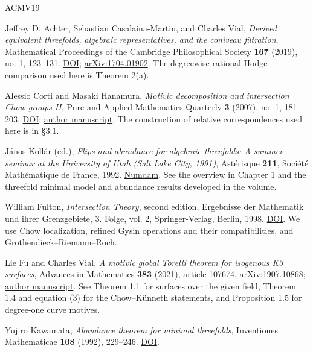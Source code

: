 \documentclass[11pt,a4paper]{article}
\begin{document}
\begin{thebibliography}{ACMV19}
\setlength{\itemsep}{0.6\baselineskip}

 Jeffrey D. Achter, Sebastian Casalaina-Martin, and Charles Vial, \emph{Derived equivalent threefolds, algebraic representatives, and the coniveau filtration}, Mathematical Proceedings of the Cambridge Philosophical Society \textbf{167} (2019), no. 1, 123--131. \href{https://doi.org/10.1017/S0305004118000221}{DOI}; \href{https://arxiv.org/abs/1704.01902}{arXiv:1704.01902}. The degreewise rational Hodge comparison used here is Theorem 2(a).

 Alessio Corti and Masaki Hanamura, \emph{Motivic decomposition and intersection Chow groups II}, Pure and Applied Mathematics Quarterly \textbf{3} (2007), no. 1, 181--203. \href{https://doi.org/10.4310/PAMQ.2007.v3.n1.a6}{DOI}; \href{https://www.ma.imperial.ac.uk/~acorti/download/md-ich.pdf}{author manuscript}. The construction of relative correspondences used here is in \S{}3.1.

 János Kollár (ed.), \emph{Flips and abundance for algebraic threefolds: A summer seminar at the University of Utah (Salt Lake City, 1991)}, Astérisque \textbf{211}, Société Mathématique de France, 1992. \href{https://numdam.org/item/AST_1992__211__1_0/}{Numdam}. See the overview in Chapter 1 and the threefold minimal model and abundance results developed in the volume.

 William Fulton, \emph{Intersection Theory}, second edition, Ergebnisse der Mathematik und ihrer Grenzgebiete, 3. Folge, vol. 2, Springer-Verlag, Berlin, 1998. \href{https://doi.org/10.1007/978-1-4612-1700-8}{DOI}. We use Chow localization, refined Gysin operations and their compatibilities, and Grothendieck--Riemann--Roch.

 Lie Fu and Charles Vial, \emph{A motivic global Torelli theorem for isogenous K3 surfaces}, Advances in Mathematics \textbf{383} (2021), article 107674. \href{https://arxiv.org/abs/1907.10868}{arXiv:1907.10868}; \href{https://irma.math.unistra.fr/~lfu/articles/DerivedEqK3.pdf}{author manuscript}. See Theorem 1.1 for surfaces over the given field, Theorem 1.4 and equation (3) for the Chow--Künneth statements, and Proposition 1.5 for degree-one curve motives.

 Yujiro Kawamata, \emph{Abundance theorem for minimal threefolds}, Inventiones Mathematicae \textbf{108} (1992), 229--246. \href{https://doi.org/10.1007/BF02100604}{DOI}.


\end{thebibliography}
\end{document}
